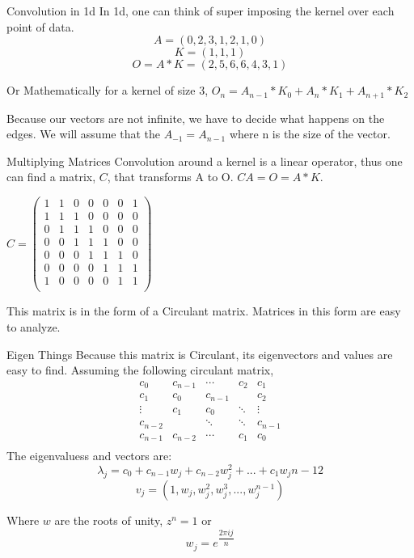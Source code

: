 \documentclass{beamer}
\begin{document}
\begin{frame} {Convolution in 1d}
In 1d, one can think of super imposing the kernel over each point of data.
$$A = (0,2,3,1,2,1,0)$$
$$K = (1,1,1)$$ 
$$O = A*K = (2,5,6,6,4,3,1)$$

Or Mathematically for a kernel of size 3, $O_n = A_{n-1}*K_{0}+A_{n}*K_{1}+A_{n+1}*K_{2}$

Because our vectors are not infinite, we have to decide what happens on the edges. We will assume that the $A_{-1} = A_{n-1}$ where n is the size of the vector.
\end{frame}


\begin{frame}{Multiplying Matrices}
Convolution around a kernel is a linear operator, thus one can find a matrix, $C$, that transforms A to O. $CA=O=A*K$.

$C = \begin{pmatrix}
	1 & 1 & 0 & 0 & 0 & 0 & 1\\
	1 & 1 & 1 & 0 & 0 & 0 & 0\\
	0 & 1 & 1 & 1 & 0 & 0 & 0\\
	0 & 0 & 1 & 1 & 1 & 0 & 0\\
	0 & 0 & 0 & 1 & 1 & 1 & 0\\
	0 & 0 & 0 & 0 & 1 & 1 & 1\\
	1 & 0 & 0 & 0 & 0 & 1 & 1\\
\end{pmatrix}$

This matrix is in the form of a Circulant matrix. Matrices in this form are easy to analyze.

\end{frame}


\begin{frame}{Eigen Things}
Because this matrix is Circulant, its eigenvectors and values are easy to find. 
Assuming the following circulant matrix, 
$$\begin{matrix}
	c_0 & c_{n-1} & \cdots & c_2 & c_1\\
	c_1 & c_0 & c_{n-1} &  & c_2\\
	\vdots & c_1 & c_0 & \ddots & \vdots\\
	c_{n-2} &   & \ddots & \ddots & c_{n-1}\\
	c_{n-1} & c_{n-2} & \cdots & c_1 & c_0\\
\end{matrix}$$
The eigenvaluess and vectors are:
$$\lambda_j =c_0+c_{n-1}w_j	+c_{n-2}w_j^2+...+c_{1}w_j{n-1}2$$
$$v_j = (1, w_j, w_j^2, w_j^3, ..., w_j^{n-1})$$

Where $w$ are the roots of unity, $z^n = 1$ or 
$$w_j = e^{\dfrac{2\pi i j}{n}}$$

\end{frame}
\end{document}
